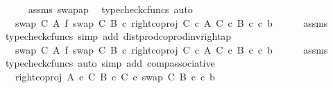 \begin{isabellebody}
\ \ \ \ \isamarkupfalse%
\ assms\ swap{\isacharunderscore}{\kern0pt}ap\ \isamarkupfalse%
\ {\isacharparenleft}{\kern0pt}typecheck{\isacharunderscore}{\kern0pt}cfuncs{\isacharcomma}{\kern0pt}\ auto{\isacharparenright}{\kern0pt}\isanewline
\ \ \isamarkupfalse%
\ \isamarkupfalse%
\ {\isachardoublequoteopen}{\isachardot}{\kern0pt}{\isachardot}{\kern0pt}{\isachardot}{\kern0pt}\ {\isacharequal}{\kern0pt}\ {\isacharparenleft}{\kern0pt}swap\ C\ A\ {\isasymbowtie}\isactrlsub f\ swap\ C\ B{\isacharparenright}{\kern0pt}\ {\isasymcirc}\isactrlsub c\ right{\isacharunderscore}{\kern0pt}coproj\ {\isacharparenleft}{\kern0pt}C\ {\isasymtimes}\isactrlsub c\ A{\isacharparenright}{\kern0pt}\ {\isacharparenleft}{\kern0pt}C\ {\isasymtimes}\isactrlsub c\ B{\isacharparenright}{\kern0pt}\ {\isasymcirc}\isactrlsub c\ {\isasymlangle}c{\isacharcomma}{\kern0pt}\ b{\isasymrangle}{\isachardoublequoteclose}\isanewline
\ \ \ \ \isamarkupfalse%
\ assms\ \isamarkupfalse%
\ {\isacharparenleft}{\kern0pt}typecheck{\isacharunderscore}{\kern0pt}cfuncs{\isacharcomma}{\kern0pt}\ simp\ add{\isacharcolon}{\kern0pt}\ dist{\isacharunderscore}{\kern0pt}prod{\isacharunderscore}{\kern0pt}coprod{\isacharunderscore}{\kern0pt}inv{\isacharunderscore}{\kern0pt}right{\isacharunderscore}{\kern0pt}ap{\isacharparenright}{\kern0pt}\isanewline
\ \ \isamarkupfalse%
\ \isamarkupfalse%
\ {\isachardoublequoteopen}{\isachardot}{\kern0pt}{\isachardot}{\kern0pt}{\isachardot}{\kern0pt}\ {\isacharequal}{\kern0pt}\ {\isacharparenleft}{\kern0pt}{\isacharparenleft}{\kern0pt}swap\ C\ A\ {\isasymbowtie}\isactrlsub f\ swap\ C\ B{\isacharparenright}{\kern0pt}\ {\isasymcirc}\isactrlsub c\ right{\isacharunderscore}{\kern0pt}coproj\ {\isacharparenleft}{\kern0pt}C\ {\isasymtimes}\isactrlsub c\ A{\isacharparenright}{\kern0pt}\ {\isacharparenleft}{\kern0pt}C\ {\isasymtimes}\isactrlsub c\ B{\isacharparenright}{\kern0pt}{\isacharparenright}{\kern0pt}\ {\isasymcirc}\isactrlsub c\ {\isasymlangle}c{\isacharcomma}{\kern0pt}\ b{\isasymrangle}{\isachardoublequoteclose}\isanewline
\ \ \ \ \isamarkupfalse%
\ assms\ \isamarkupfalse%
\ {\isacharparenleft}{\kern0pt}typecheck{\isacharunderscore}{\kern0pt}cfuncs{\isacharcomma}{\kern0pt}\ auto\ simp\ add{\isacharcolon}{\kern0pt}\ comp{\isacharunderscore}{\kern0pt}associative{}{\isacharparenright}{\kern0pt}\isanewline
\ \ \isamarkupfalse%
\ \isamarkupfalse%
\ {\isachardoublequoteopen}{\isachardot}{\kern0pt}{\isachardot}{\kern0pt}{\isachardot}{\kern0pt}\ {\isacharequal}{\kern0pt}\ {\isacharparenleft}{\kern0pt}right{\isacharunderscore}{\kern0pt}coproj\ {\isacharparenleft}{\kern0pt}A\ {\isasymtimes}\isactrlsub c\ C{\isacharparenright}{\kern0pt}\ {\isacharparenleft}{\kern0pt}B\ {\isasymtimes}\isactrlsub c\ C{\isacharparenright}{\kern0pt}\ {\isasymcirc}\isactrlsub c\ swap\ C\ B{\isacharparenright}{\kern0pt}\ {\isasymcirc}\isactrlsub c\ {\isasymlangle}c{\isacharcomma}{\kern0pt}\ b{\isasymrangle}{\isachardoublequoteclose}\isanewline

\end{isabellebody}
